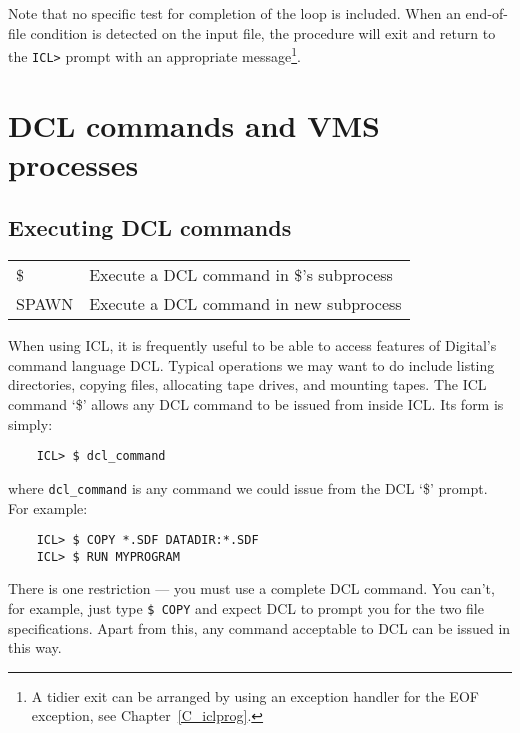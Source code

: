 Note that no specific test for completion of the loop is included.
When an end-of-file condition is detected on the input file, the procedure will
exit and return to the {\small\tt ICL>} prompt with an appropriate
message\footnote{A tidier exit can be arranged by using an exception handler
for the EOF exception, see Chapter~\ref{C_iclprog}.}.

\section{DCL commands and VMS processes}
\label{S_dclvms}

\subsection{Executing DCL commands}

\begin{center}
\begin{tabular}{|l|l|}
\hline
\$       & Execute a DCL command in \$'s subprocess \\
SPAWN    & Execute a DCL command in new subprocess \\
\hline
\end{tabular}
\end{center}

When using ICL, it is frequently useful to be able to access features of
Digital's command language DCL.
Typical operations we may want to do include listing directories, copying
files, allocating tape drives, and mounting tapes.
The ICL command `\$' allows any DCL command to be issued from inside ICL.
Its form is simply:

\begin{small}
\begin{verbatim}
    ICL> $ dcl_command
\end{verbatim}
\end{small}

where \verb+dcl_command+ is any command we could issue from the DCL `\$' prompt.
For example:

\begin{small}
\begin{verbatim}
    ICL> $ COPY *.SDF DATADIR:*.SDF
    ICL> $ RUN MYPROGRAM
\end{verbatim}
\end{small}

There is one restriction --- you must use a complete DCL command.
You can't, for example, just type {\small\tt \$ COPY} and expect DCL to prompt
you for the two file specifications.
Apart from this, any command acceptable to DCL can be issued in this way.


